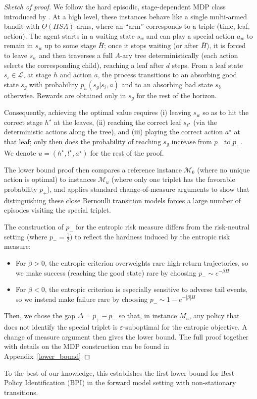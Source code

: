 \documentclass[final,12pt]{colt2026} %
\begin{document}
\begin{proof}[Sketch of proof]
We follow the hard episodic, stage-dependent MDP class introduced by \citet{domingues2021episodic}. 
At a high level, these instances behave like a single multi-armed bandit with 
$\Theta(HSA)$ arms, where an ``arm'' corresponds to a triple (time, leaf, action). 
The agent starts in a waiting state $s_w$ and can play a special action $a_w$ to remain in $s_w$ up to some stage $\bar H$; once it stops waiting (or after $\bar H$), it is forced to leave $s_w$ and then traverses a full $A$-ary tree deterministically (each action selects the corresponding child), reaching a leaf after $d$ steps. 
From a leaf state $s_i\in\mathcal L$, at stage $h$ and action $a$, the process transitions to an absorbing good state $s_g$ with probability $p_h(s_g|s_i,a)$
and to an absorbing bad state $s_b$ otherwise. Rewards are obtained only in $s_g$ for the rest of the horizon. 

Consequently, achieving the optimal value requires (i) leaving $s_w$ so as to hit the correct stage $h^\star$ at the leaves, (ii) reaching the correct leaf $s_{\ell^\star}$ (via the deterministic actions along the tree), and (iii) playing the correct action $a^\star$ at that leaf; only then does the probability of reaching $s_g$ increase from $p_-$ to $p_+$. We denote $u = (h^\star,l^\star,a^\star)$ for the rest of the proof.

The lower bound proof then compares a reference instance $\mathcal{M}_0$ (where no unique action is optimal) to instances $\mathcal{M}_u$ (where only one triplet has the favorable probability $p_+$), and applies standard change-of-measure arguments to show that distinguishing these close Bernoulli transition models forces a large number of episodes visiting the special triplet. 

The construction of $p_-$ for the entropic risk measure differs from the risk-neutral setting (where $p_- = \frac{1}{2})$ to reflect the hardness induced by the entropic risk measure:
\begin{itemize}
    \item For $\beta >0$, the entropic criterion overweights rare high-return trajectories, so we make success (reaching the good state) rare by choosing $p_- \sim  e^{-\beta H}$
    \item For $\beta<0$, the entropic criterion is especially sensitive to adverse tail events, so we instead make failure rare by choosing $p_- \sim 1 - e^{-|\beta|H}$
\end{itemize}
Then, we chose the gap $\Delta = p_+ - p_-$ so that, in instance $M_u$, any policy that does not identify the special triplet is $\varepsilon$-suboptimal for the entropic objective. A change of measure argument \citep{kauffman2016} then gives the lower bound. The full proof together with details on the MDP construction can be found in Appendix~\ref{lower_bound}
\end{proof}
To the best of our knowledge, this establishes the first lower bound for Best Policy Identification (BPI) in the forward model setting with non-stationary transitions.
\end{document}
